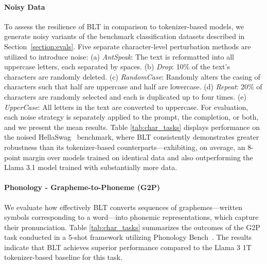 \paragraph{Noisy Data} To assess the resilience of {\textsc BLT} in comparison to tokenizer-based models, we generate noisy variants of the benchmark classification datasets described in Section~\ref{section:evals}. Five separate character-level perturbation methods are utilized to introduce noise: (a) \textit{AntSpeak}: The text is reformatted into all uppercase letters, each separated by spaces. (b) \textit{Drop}: 10\% of the text's characters are randomly deleted. (c) \textit{RandomCase}: Randomly alters the casing of characters such that half are uppercase and half are lowercase. (d) \textit{Repeat}: 20\% of characters are randomly selected and each is duplicated up to four times. (e) \textit{UpperCase}: All letters in the text are converted to uppercase. For evaluation, each noise strategy is separately applied to the prompt, the completion, or both, and we present the mean results. Table \ref{tab:char_tasks} displays performance on the noised HellaSwag~\citep{Eval_hellaswag} benchmark, where {\textsc BLT} consistently demonstrates greater robustness than its tokenizer-based counterparts—exhibiting, on average, an 8-point margin over models trained on identical data and also outperforming the Llama 3.1 model trained with substantially more data.

\paragraph{Phonology - Grapheme-to-Phoneme (G2P)} We evaluate how effectively {\textsc BLT} converts sequences of graphemes—written symbols corresponding to a word—into phonemic representations, which capture their pronunciation. Table \ref{tab:char_tasks} summarizes the outcomes of the G2P task conducted in a 5-shot framework utilizing Phonology Bench~\citep{suvarna2024phonologybench}. The results indicate that {\textsc BLT} achieves superior performance compared to the Llama 3 1T tokenizer-based baseline for this task.

